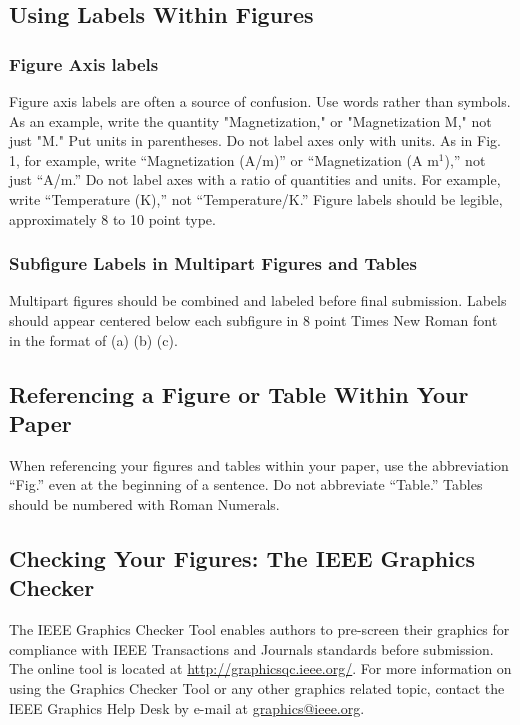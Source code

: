 \subsection{Using Labels Within Figures}	
\subsubsection{Figure Axis labels}
Figure axis labels are often a source of confusion. Use words rather than symbols. As an example, write the quantity "Magnetization," or "Magnetization M," not just "M." Put units in parentheses. Do not label axes only with units. As in Fig. 1, for example, write “Magnetization (A/m)” or “Magnetization (A m$^1$),” not just “A/m.” Do not label axes with a ratio of quantities and units. For example, write “Temperature (K),” not “Temperature/K.” 
Figure labels should be legible, approximately 8 to 10 point type.\\

\subsubsection{Subfigure Labels in Multipart Figures and Tables}
Multipart figures should be combined and labeled before final submission. Labels should appear centered below each subfigure in 8 point Times New Roman font in the format of (a) (b) (c). 

\subsection{Referencing a Figure or Table Within Your Paper}
When referencing your figures and tables within your paper, use the abbreviation “Fig.” even at the beginning of a sentence. Do not abbreviate “Table.” Tables should be numbered with Roman Numerals.

\subsection{Checking Your Figures: The IEEE Graphics Checker}
The IEEE Graphics Checker Tool enables authors to pre-screen their graphics for compliance with IEEE Transactions and Journals standards before submission. The online tool is located at \underline{http://graphicsqc.ieee.org/}. For more information on using the Graphics Checker Tool 
or any other graphics related topic, contact the IEEE Graphics Help Desk by e-mail at \underline{graphics@ieee.org}.
